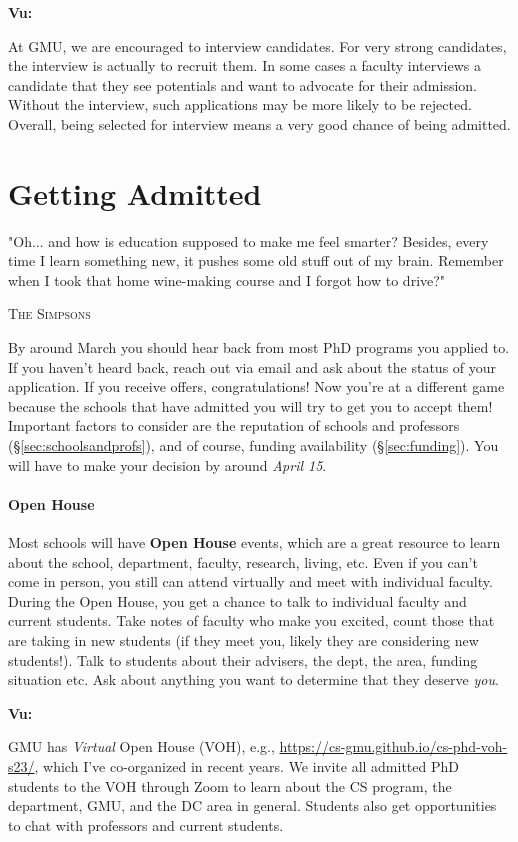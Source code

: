 \documentclass[11pt]{article}
\newenvironment{commentbox}[1][]{
\small
    \begin{mybox}
    {\small \textbf{#1}}
 }{
   \end{mybox}
}
\begin{document}
\begin{commentbox}[Vu:]
At GMU, we are encouraged to interview candidates. For very strong candidates, the interview is actually to recruit them.  In some cases a faculty interviews a candidate that they see potentials and want to advocate for their admission. Without the interview, such applications may be more likely to be rejected. Overall, being selected for interview means a very good chance of being admitted.
\end{commentbox}

\section{Getting Admitted}\label{sec:accepted}

\epigraph{"Oh... and how is education supposed to make me feel smarter? Besides, every time I learn something new, it pushes some old stuff out of my brain. Remember when I took that home wine-making course and I forgot how to drive?"}{\textsc{The Simpsons}}

By around March you should hear back from most PhD programs you applied to. If you haven't heard back, reach out via email and ask about the status of your application.
If you receive offers, congratulations!  Now you're at a different game because the schools that have admitted you will try to get you to accept them!  Important factors to consider are the reputation of schools and professors (\S\ref{sec:schoolsandprofs}), and of course, funding availability (\S\ref{sec:funding}). You will have to make your decision by around \emph{April 15}.

\paragraph{Open House} Most schools will have \textbf{Open House} events, which are a great resource to learn about the school, department, faculty, research, living, etc. Even if you can't come in person, you still can attend virtually and meet with individual faculty.
During the Open House, you get a chance to talk to individual faculty and current students.  Take notes of faculty who make you excited, count those that are taking in new students (if they meet you, likely they are considering new students!).  Talk to students about their advisers, the dept, the area, funding situation etc.  Ask about anything you want to determine that they deserve \emph{you}.

\begin{commentbox}[Vu:]
GMU has \emph{Virtual} Open House (VOH), e.g., \url{https://cs-gmu.github.io/cs-phd-voh-s23/}, which I've co-organized in recent years. We invite all admitted PhD students to the VOH through Zoom to learn about the CS program, the department, GMU, and the DC area in general. Students also get opportunities to chat with professors and current students.
\end{commentbox}
\end{document}

